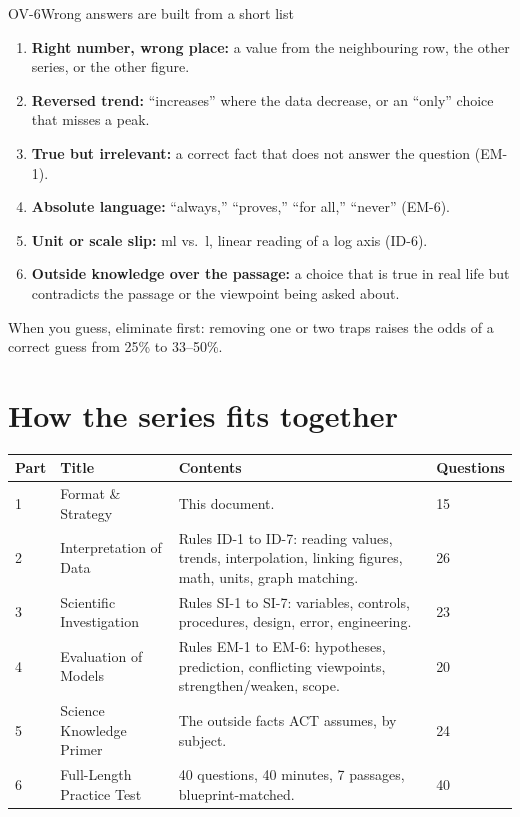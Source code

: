 \documentclass[11pt]{article}
\begin{document}
\begin{rulebox}{OV-6}{Wrong answers are built from a short list}
\begin{enumerate}
\item \textbf{Right number, wrong place:} a value from the neighbouring row, the other series, or the other figure.
\item \textbf{Reversed trend:} ``increases'' where the data decrease, or an ``only'' choice that misses a peak.
\item \textbf{True but irrelevant:} a correct fact that does not answer the question (EM-1).
\item \textbf{Absolute language:} ``always,'' ``proves,'' ``for all,'' ``never'' (EM-6).
\item \textbf{Unit or scale slip:} \si{\milli\litre} vs.\ \si{\litre}, linear reading of a log axis (ID-6).
\item \textbf{Outside knowledge over the passage:} a choice that is true in real life but contradicts the passage or the viewpoint being asked about.
\end{enumerate}
When you guess, eliminate first: removing one or two traps raises the odds of a correct guess from 25\% to 33--50\%.
\end{rulebox}

\section{How the series fits together}\label{sec:plan}

\small
\begin{tabularx}{\linewidth}{@{}l l X l@{}}
\toprule
Part & Title & Contents & Questions\\\midrule
1 & Format \& Strategy & This document. & 15\\
2 & Interpretation of Data & Rules ID-1 to ID-7: reading values, trends, interpolation, linking figures, math, units, graph matching. & 26\\
3 & Scientific Investigation & Rules SI-1 to SI-7: variables, controls, procedures, design, error, engineering. & 23\\
4 & Evaluation of Models & Rules EM-1 to EM-6: hypotheses, prediction, conflicting viewpoints, strengthen/weaken, scope. & 20\\
5 & Science Knowledge Primer & The outside facts ACT assumes, by subject. & 24\\
6 & Full-Length Practice Test & 40 questions, 40 minutes, 7 passages, blueprint-matched. & 40\\
\bottomrule
\end{tabularx}
\normalsize
\end{document}

